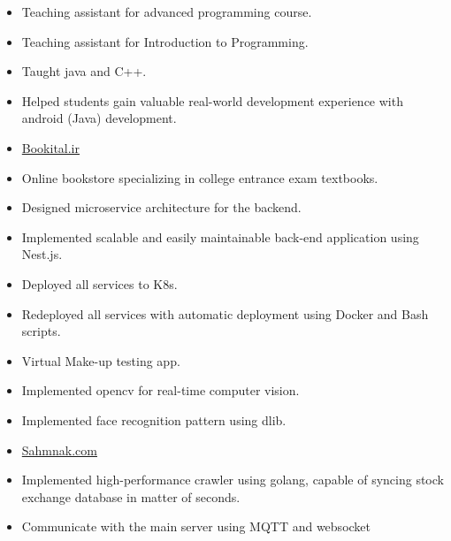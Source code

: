 \documentclass[10pt,a4paper,ragged2e,withhyper]{altacv}
\begin{document}
\begin{paracol}{2}
\divider

\begin{itemize}
\item Teaching assistant for advanced programming course.
\item Teaching assistant for Introduction to Programming.
\item Taught java and C++.
\item Helped students gain valuable real-world development experience with android (Java) development.
\end{itemize}



\begin{itemize}
\item \href{https://bookital.ir}{Bookital.ir}
\item Online bookstore specializing in college entrance exam textbooks.
\item Designed microservice architecture for the backend.
\item Implemented scalable and easily maintainable back-end application using Nest.js. 
\item Deployed all services to K8s.
\item Redeployed all services with automatic deployment using Docker and Bash scripts.
\end{itemize}

\divider

\begin{itemize}
\item Virtual Make-up testing app.
\item Implemented opencv for real-time computer vision.
\item Implemented face recognition pattern using dlib.
\end{itemize}

\divider

\begin{itemize}
\item \href{https://sahmnak.com}{Sahmnak.com}
\item Implemented high-performance crawler using golang, capable of syncing stock exchange database in matter of seconds.
\item Communicate with the main server using MQTT and websocket
\end{itemize}


\end{paracol}
\end{document}
